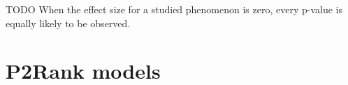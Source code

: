 TODO When the effect size for a studied phenomenon is zero, every p-value is equally likely to be observed.



\section{P2Rank models}











